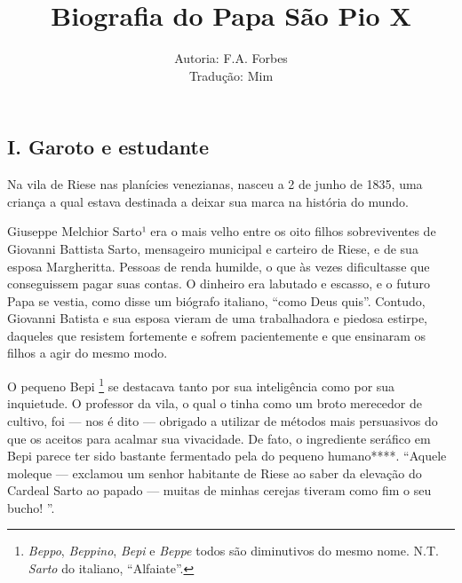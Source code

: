 \documentclass[12pt,a4paper,oneside]{book}
\title{\textbf {Biografia do Papa São Pio X}}
\author{Autoria: F.A. Forbes \\ Tradução: Mim}
\begin{document}
\setcounter{page}{3}



\maketitle

\pagebreak
\quad
\thispagestyle{fancy}



\pagebreak
\fancyfoot{}
\begin{center}
    {\section*{I. Garoto e estudante}}

\end{center}

 
\quad Na vila de Riese nas planícies venezianas, nasceu a 2 de junho de 1835, uma criança a qual estava destinada a deixar sua marca na história do mundo.

\quad Giuseppe Melchior Sarto¹ era o mais velho entre os oito filhos sobreviventes de Giovanni Battista Sarto, mensageiro municipal e carteiro de Riese, e de sua esposa Margheritta. Pessoas de renda humilde, o que às vezes dificultasse que conseguissem pagar suas contas. O dinheiro era labutado e escasso, e o futuro Papa se vestia, como disse um biógrafo italiano, ``como Deus quis''. Contudo, Giovanni Batista e sua esposa vieram de uma trabalhadora e piedosa estirpe, daqueles que resistem fortemente e sofrem pacientemente e que ensinaram os filhos a agir do mesmo modo.



O pequeno Bepi
 \footnote[1]{\emph{Beppo}, \emph{Beppino}, \emph{Bepi} e \emph{Beppe} todos são diminutivos do mesmo nome.
N.T. \emph{Sarto} do italiano, ``Alfaiate''.}
se destacava tanto por sua inteligência como por sua inquietude. O professor da vila, o qual o tinha como um broto merecedor de cultivo, foi --- nos é dito --- obrigado a utilizar de métodos mais persuasivos do que os aceitos para acalmar sua vivacidade. De fato, o ingrediente seráfico em Bepi
 parece ter sido bastante fermentado pela do pequeno humano****. ``Aquele moleque --- exclamou um senhor habitante de Riese ao saber da elevação do Cardeal Sarto ao papado --- muitas de minhas cerejas tiveram como fim o seu bucho! ''.
\end{document}
